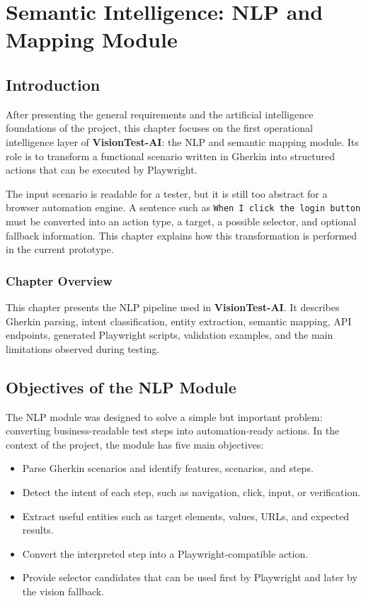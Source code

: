\chapter{Semantic Intelligence: NLP and Mapping Module}
\label{chap:nlp_mapping}
\minitoc
\newpage

\section{Introduction}
\label{sec:ch3_intro}

After presenting the general requirements and the artificial intelligence foundations of the project, this chapter focuses on the first operational intelligence layer of \textbf{VisionTest-AI}: the NLP and semantic mapping module. Its role is to transform a functional scenario written in Gherkin into structured actions that can be executed by Playwright.

The input scenario is readable for a tester, but it is still too abstract for a browser automation engine. A sentence such as \texttt{When I click the login button} must be converted into an action type, a target, a possible selector, and optional fallback information. This chapter explains how this transformation is performed in the current prototype.

\subsection*{Chapter Overview}
{}

This chapter presents the NLP pipeline used in \textbf{VisionTest-AI}. It describes Gherkin parsing, intent classification, entity extraction, semantic mapping, API endpoints, generated Playwright scripts, validation examples, and the main limitations observed during testing.

\section{Objectives of the NLP Module}
\label{sec:nlp_objectives}

The NLP module was designed to solve a simple but important problem: converting business-readable test steps into automation-ready actions. In the context of the project, the module has five main objectives:

\begin{itemize}
	\item Parse Gherkin scenarios and identify features, scenarios, and steps.
	\item Detect the intent of each step, such as navigation, click, input, or verification.
	\item Extract useful entities such as target elements, values, URLs, and expected results.
	\item Convert the interpreted step into a Playwright-compatible action.
	\item Provide selector candidates that can be used first by Playwright and later by the vision fallback.
\end{itemize}

